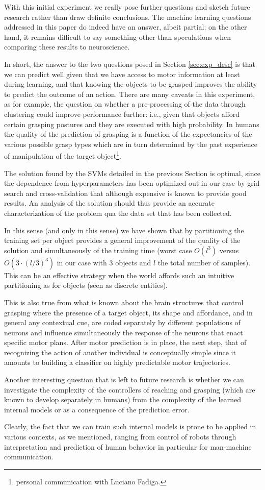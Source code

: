 With this initial experiment we really pose further questions and
sketch future research rather than draw definite conclusions. The
machine learning questions addressed in this paper do indeed have an
answer, albeit partial; on the other hand, it remains difficult to say
something other than speculations when comparing these results to
neuroscience.

In short, the answer to the two questions posed in Section
\ref{sec:exp_desc} is that we can predict well given that we have
access to motor information at least during learning, and that knowing
the objects to be grasped improves the ability to predict the outcome
of an action. There are many caveats in this experiment, as for
example, the question on whether a pre-processing of the data through
clustering could improve performance further: i.e., given that objects
afford certain grasping postures and they are executed with high
probability. In humans the quality of the prediction of grasping is a
function of the expectancies of the various possible grasp types which
are in turn determined by the past experience of manipulation of the
target object\footnote{personal communication with Luciano Fadiga.}.

The solution found by the SVMs detailed in the previous Section is
optimal, since the dependence from hyperparameters has been optimized
out in our case by grid search and cross-validation that although
expensive is known to provide good results. An analysis of the
solution should thus provide an accurate characterization of the
problem qua the data set that has been collected.

In this sense (and only in this sense) we have shown that by
partitioning the training set per object provides a general
improvement of the quality of the solution and simultaneously of the
training time (worst case $O(l^3)$ versus $O(3 \cdot (l/3)^3)$ in our
case with $3$ objects and $l$ the total number of samples). This can
be an effective strategy when the world affords such an intuitive
partitioning as for objects (seen as discrete entities).

This is also true from what is known about the brain structures that
control grasping where the presence of a target object, its shape and
affordance, and in general any contextual cue, are coded separately by
different populations of neurons and influence simultaneously the
response of the neurons that enact specific motor plans. After motor
prediction is in place, the next step, that of recognizing the action
of another individual is conceptually simple since it amounts to
building a classifier on highly predictable motor trajectories.

Another interesting question that is left to future research is
whether we can investigate the complexity of the controllers of
reaching and grasping (which are known to develop separately in
humans) from the complexity of the learned internal models or as a
consequence of the prediction error.

Clearly, the fact that we can train such internal models is prone to
be applied in various contexts, as we mentioned, ranging from control
of robots through interpretation and prediction of human behavior in
particular for man-machine communication.
